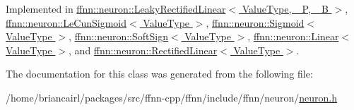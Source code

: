 Implemented in \hyperlink{classffnn_1_1neuron_1_1_leaky_rectified_linear_a6a96858235a3c4a8195b27699032a849}{ffnn\-::neuron\-::\-Leaky\-Rectified\-Linear$<$ Value\-Type, \-\_\-\-P, \-\_\-\-B $>$}, \hyperlink{classffnn_1_1neuron_1_1_le_cun_sigmoid_abac0c8e08b1289c288923fd8e6f12ce2}{ffnn\-::neuron\-::\-Le\-Cun\-Sigmoid$<$ Value\-Type $>$}, \hyperlink{classffnn_1_1neuron_1_1_sigmoid_a68c1cf4f268509e87a471440d11e7682}{ffnn\-::neuron\-::\-Sigmoid$<$ Value\-Type $>$}, \hyperlink{classffnn_1_1neuron_1_1_soft_sign_ac6e67e51f8879c44940ef0c419911259}{ffnn\-::neuron\-::\-Soft\-Sign$<$ Value\-Type $>$}, \hyperlink{classffnn_1_1neuron_1_1_linear_a4d92b666c3e0a81865be7d09c0c4016e}{ffnn\-::neuron\-::\-Linear$<$ Value\-Type $>$}, and \hyperlink{classffnn_1_1neuron_1_1_rectified_linear_aa6f5d5fab4b2468fa36e208ed885782c}{ffnn\-::neuron\-::\-Rectified\-Linear$<$ Value\-Type $>$}.



The documentation for this class was generated from the following file\-:\begin{DoxyCompactItemize}
\item 
/home/briancairl/packages/src/ffnn-\/cpp/ffnn/include/ffnn/neuron/\hyperlink{neuron_8h}{neuron.\-h}\end{DoxyCompactItemize}

